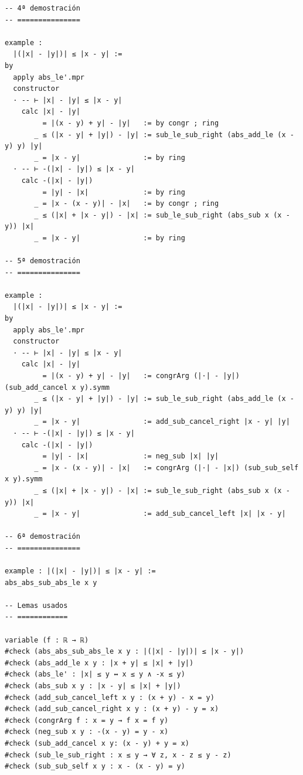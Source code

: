 \begin{verbatim}
-- 4ª demostración
-- ===============

example :
  |(|x| - |y|)| ≤ |x - y| :=
by
  apply abs_le'.mpr
  constructor
  · -- ⊢ |x| - |y| ≤ |x - y|
    calc |x| - |y|
         = |(x - y) + y| - |y|   := by congr ; ring
       _ ≤ (|x - y| + |y|) - |y| := sub_le_sub_right (abs_add_le (x - y) y) |y|
       _ = |x - y|               := by ring
  · -- ⊢ -(|x| - |y|) ≤ |x - y|
    calc -(|x| - |y|)
         = |y| - |x|             := by ring
       _ = |x - (x - y)| - |x|   := by congr ; ring
       _ ≤ (|x| + |x - y|) - |x| := sub_le_sub_right (abs_sub x (x - y)) |x|
       _ = |x - y|               := by ring

-- 5ª demostración
-- ===============

example :
  |(|x| - |y|)| ≤ |x - y| :=
by
  apply abs_le'.mpr
  constructor
  · -- ⊢ |x| - |y| ≤ |x - y|
    calc |x| - |y|
         = |(x - y) + y| - |y|   := congrArg (|·| - |y|) (sub_add_cancel x y).symm
       _ ≤ (|x - y| + |y|) - |y| := sub_le_sub_right (abs_add_le (x - y) y) |y|
       _ = |x - y|               := add_sub_cancel_right |x - y| |y|
  · -- ⊢ -(|x| - |y|) ≤ |x - y|
    calc -(|x| - |y|)
         = |y| - |x|             := neg_sub |x| |y|
       _ = |x - (x - y)| - |x|   := congrArg (|·| - |x|) (sub_sub_self x y).symm
       _ ≤ (|x| + |x - y|) - |x| := sub_le_sub_right (abs_sub x (x - y)) |x|
       _ = |x - y|               := add_sub_cancel_left |x| |x - y|

-- 6ª demostración
-- ===============

example : |(|x| - |y|)| ≤ |x - y| :=
abs_abs_sub_abs_le x y

-- Lemas usados
-- ============

variable (f : ℝ → ℝ)
#check (abs_abs_sub_abs_le x y : |(|x| - |y|)| ≤ |x - y|)
#check (abs_add_le x y : |x + y| ≤ |x| + |y|)
#check (abs_le' : |x| ≤ y ↔ x ≤ y ∧ -x ≤ y)
#check (abs_sub x y : |x - y| ≤ |x| + |y|)
#check (add_sub_cancel_left x y : (x + y) - x = y)
#check (add_sub_cancel_right x y : (x + y) - y = x)
#check (congrArg f : x = y → f x = f y)
#check (neg_sub x y : -(x - y) = y - x)
#check (sub_add_cancel x y: (x - y) + y = x)
#check (sub_le_sub_right : x ≤ y → ∀ z, x - z ≤ y - z)
#check (sub_sub_self x y : x - (x - y) = y)
\end{verbatim}

